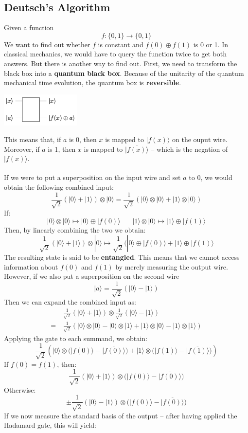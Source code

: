 \documentclass{article}
\begin{document}
\subsection{Deutsch's Algorithm}
Given a function
\[ f : \{ 0, 1 \} \rightarrow \{ 0, 1 \} \]
We want to find out whether $f$ is constant and $f(0) \oplus f(1)$ is 0 or 1. In classical mechanics, we would have to query the function twice to get both answers. But there is another way to find out. First, we need to transform the black box into a \textbf{quantum black box}. Because of the unitarity of the quantum mechanical time evolution, the quantum box is \textbf{reversible}.

\begin{center}
	\includegraphics[width=4cm]{assets/deutsch.png}
\end{center}
This means that, if $a$ is 0, then $x$ is mapped to $|f(x)\rangle$ on the ouput wire. Moreover, if $a$ is 1, then $x$ is mapped to $\overline{|f(x)\rangle}$ -- which is the negation of $|f(x)\rangle$. \\ \\
If we were to put a superposition on the input wire and set $a$ to 0, we would obtain the following combined input:
\[ \frac{1}{\sqrt{2}}(|0\rangle + |1\rangle) \otimes |0\rangle = \frac{1}{\sqrt{2}} (|0\rangle \otimes |0\rangle + |1\rangle \otimes |0\rangle) \]
If:
\[ |0\rangle \otimes |0\rangle \mapsto |0\rangle \oplus |f(0)\rangle ~~~~~~~~ |1\rangle \otimes |0\rangle \mapsto |1\rangle \oplus |f(1)\rangle \]
Then, by linearly combining the two we obtain:
\[ \frac{1}{\sqrt{2}}(|0\rangle + |1\rangle) \otimes |0\rangle \mapsto \frac{1}{\sqrt{2}}(|0\rangle \oplus |f(0)\rangle + |1\rangle \oplus |f(1)\rangle \]
The resulting state is said to be \textbf{entangled}. This means that we cannot access information about $f(0)$ and $f(1)$ by merely measuring the output wire. However, if we also put a superposition on the second wire
\[ |a\rangle = \frac{1}{\sqrt{2}}(|0\rangle - |1\rangle) \]
Then we can expand the combined input as:
\begin{align*}
	& \frac{1}{\sqrt{2}}(|0\rangle + |1\rangle) \otimes \frac{1}{\sqrt{2}}(|0\rangle - |1\rangle) \\
	=~& \frac{1}{\sqrt{2}}(|0\rangle \otimes |0\rangle - |0\rangle \otimes |1\rangle + |1\rangle \otimes |0\rangle  - |1\rangle \otimes |1\rangle)
\end{align*}
Applying the gate to each summand, we obtain:
\[ \frac{1}{\sqrt{2}} \left( |0\rangle \otimes \big( |f(0)\rangle - \overline{|f(0)\rangle} \big) + |1\rangle \otimes \big( |f(1)\rangle - \overline{|f(1)\rangle} \big) \right) \]
If $f(0) = f(1)$, then:
\[ \frac{1}{\sqrt{2}}(|0\rangle + |1\rangle) \otimes \big( |f(0)\rangle - \overline{|f(0)\rangle} \big) \]
Otherwise:
\[ \pm \frac{1}{\sqrt{2}}(|0\rangle - |1\rangle) \otimes \big( |f(0)\rangle - \overline{|f(0)\rangle} \big) \]
If we now measure the standard basis of the output -- after having applied the Hadamard gate, this will yield:
\end{document}
